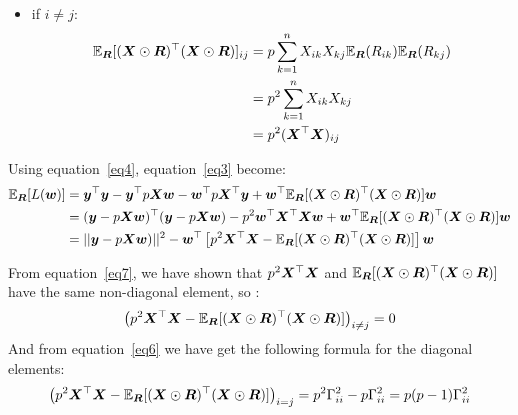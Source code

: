 {\begin{enumerate}
\begin{itemize}
		We can prove easily that $\E[X^2]=p$, for $X\sim\textnormal{Bern}(p)$:\\
		We know that $E(X)=p$, $Var(X)=p(1-p)$ and $Var(X)=E(X^2)-E(X)^2$, so:
		$$E(X^2)=Var(X)+E(X)^2=p-p^2+p^2=p$$
		
		back to equation \ref{eq5}, we get:
		\begin{equation} \label{eq6}
		\begin{split}
		\E_{\mR}[(\mX\odot\mR)^\top(\mX\odot\mR)]_{ii} & = p \sum_{k=1}^{n} X_{ik}^2 \\
		& = p (\mX^\top\mX)_{ii}\\
		& = p \Gamma_{ii}^2
		\end{split}
		\end{equation}
		
		\item if $i \neq j$:
		\begin{equation} \label{eq7}
		\begin{split}
		\mathbb{E}_{{\bm{R}}}[({\bm{X}}\odot{\bm{R}})^\top({\bm{X}}\odot{\bm{R}})]_{ij} & = p \sum_{k=1}^{n} X_{ik}X_{kj}  \mathbb{E}_{{\bm{R}}}(R_{ik})  \mathbb{E}_{{\bm{R}}}(R_{kj})\\
		& = p^2 \sum_{k=1}^{n} X_{ik}X_{kj}\\
		& = p^2 ({\bm{X}}^\top{\bm{X}})_{ij}\\
		\end{split}
		\end{equation}
	\end{itemize}
	
	Using equation~\ref{eq4}, equation~\ref{eq3} become:
	\begin{equation} \label{eq8}
	\begin{split}
	\mathbb{E}_{{\bm{R}}}[L({\bm{w}})] & = {\bm{y}}^\top{\bm{y}} - {\bm{y}}^\top p{\bm{X}}{\bm{w}}-{\bm{w}}^\top p{\bm{X}}^\top{\bm{y}}+{\bm{w}}^\top\mathbb{E}_{{\bm{R}}}[({\bm{X}}\odot{\bm{R}})^\top({\bm{X}}\odot{\bm{R}})]{\bm{w}}\\
	& = ({\bm{y}} - p{\bm{X}}{\bm{w}})^\top({\bm{y}} - p{\bm{X}}{\bm{w}})-p^2{\bm{w}}^\top{\bm{X}}^\top{\bm{X}}{\bm{w}}+{\bm{w}}^\top\mathbb{E}_{{\bm{R}}}[({\bm{X}}\odot{\bm{R}})^\top({\bm{X}}\odot{\bm{R}})]{\bm{w}}\\
	& = ||{\bm{y}} - p{\bm{X}}{\bm{w}})||^2-{\bm{w}}^\top\left[p^2{\bm{X}}^\top{\bm{X}}-\mathbb{E}_{{\bm{R}}}[({\bm{X}}\odot{\bm{R}})^\top({\bm{X}}\odot{\bm{R}})]\right]{\bm{w}}
	\end{split}
	\end{equation}
	
	From equation~\ref{eq7}, we have shown that $p^2{\bm{X}}^\top{\bm{X}}$ and $\mathbb{E}_{{\bm{R}}}[({\bm{X}}\odot{\bm{R}})^\top({\bm{X}}\odot{\bm{R}})]$ have the same non-diagonal element, so :
	$$\left(p^2{\bm{X}}^\top{\bm{X}} - \mathbb{E}_{{\bm{R}}}[({\bm{X}}\odot{\bm{R}})^\top({\bm{X}}\odot{\bm{R}})]\right)_{i \neq j}=0$$
	And from equation~\ref{eq6} we have get the following formula for the diagonal elements:
	$$\left(p^2{\bm{X}}^\top{\bm{X}} - \mathbb{E}_{{\bm{R}}}[({\bm{X}}\odot{\bm{R}})^\top({\bm{X}}\odot{\bm{R}})]\right)_{i = j}=p^2\Gamma_{ii}^2 - p\Gamma_{ii}^2 = p(p-1)\Gamma_{ii}^2$$
	

\end{enumerate}}

